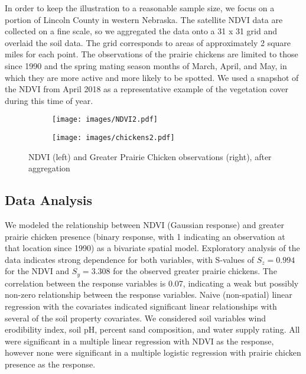 \documentclass[12pt, a4paper, twoside]{article}
\begin{document}
In order to keep the illustration to a reasonable sample size, we focus on a portion of Lincoln County in western Nebraska. The satellite NDVI data are collected on a fine scale, so we aggregated the data onto a 31 x 31 grid and overlaid the soil data. The grid corresponds to areas of approximately 2 square miles for each point. The observations of the prairie chickens are limited to those since 1990 and the spring mating season months of March, April, and May, in which they are more active and more likely to be spotted. We used a snapshot of the NDVI from April 2018 as a representative example of the vegetation cover during this time of year. 
\begin{figure}[H] \label{ChickensNDVI}
	\begin{subfigure}{0.5\textwidth}
	\texttt{[image: images/NDVI2.pdf]}
	\end{subfigure}
	\begin{subfigure}{0.5\textwidth}
	\texttt{[image: images/chickens2.pdf]}
	\end{subfigure}
\caption[Raster images of NDVI and Greater Prairie Chicken observations]{NDVI (left) and Greater Prairie Chicken observations (right), after aggregation}
\end{figure}

\subsection{Data Analysis}
We modeled the relationship between NDVI (Gaussian response) and greater prairie chicken presence (binary response, with 1 indicating an observation at that location since 1990) as a bivariate spatial model. Exploratory analysis of the data indicates strong dependence for both variables, with S-values of $S_z = 0.994$ for the NDVI and $S_y = 3.308$ for the observed greater prairie chickens. The correlation between the response variables is 0.07, indicating a weak but possibly non-zero relationship between the response variables. Naive (non-spatial) linear regression with the covariates indicated significant linear relationships with several of the soil property covariates. We considered soil variables wind erodibility index, soil pH, percent sand composition, and water supply rating. All were significant in a multiple linear regression with NDVI as the response, however none were significant in a multiple logistic regression with prairie chicken presence as the response.
\end{document}
